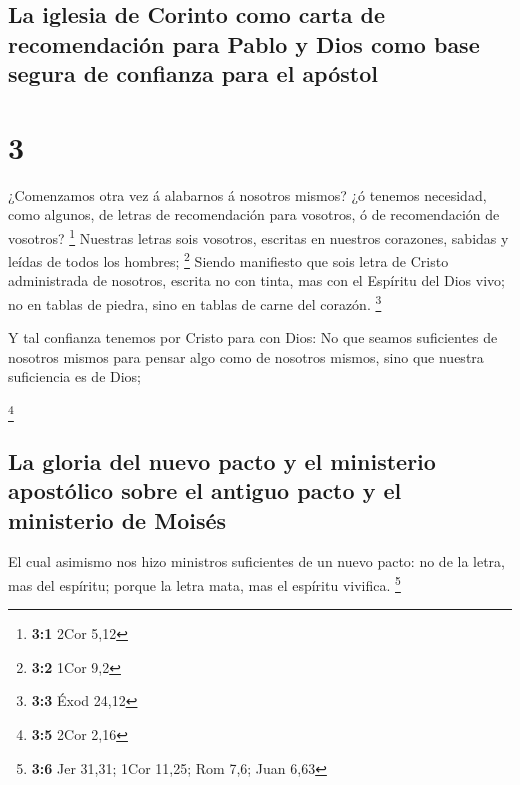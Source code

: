 \hypertarget{la-iglesia-de-corinto-como-carta-de-recomendaciuxf3n-para-pablo-y-dios-como-base-segura-de-confianza-para-el-apuxf3stol}{%
\subsection{La iglesia de Corinto como carta de recomendación para Pablo
y Dios como base segura de confianza para el
apóstol}\label{la-iglesia-de-corinto-como-carta-de-recomendaciuxf3n-para-pablo-y-dios-como-base-segura-de-confianza-para-el-apuxf3stol}}

\hypertarget{section-2}{%
\section{3}\label{section-2}}

 ¿Comenzamos otra vez á alabarnos á nosotros mismos? ¿ó
tenemos necesidad, como algunos, de letras de recomendación para
vosotros, ó de recomendación de vosotros? \footnote{\textbf{3:1} 2Cor
  5,12}  Nuestras letras sois vosotros, escritas en
nuestros corazones, sabidas y leídas de todos los hombres; \footnote{\textbf{3:2}
  1Cor 9,2}  Siendo manifiesto que sois letra de Cristo
administrada de nosotros, escrita no con tinta, mas con el Espíritu del
Dios vivo; no en tablas de piedra, sino en tablas de carne del corazón.
\footnote{\textbf{3:3} Éxod 24,12}

 Y tal confianza tenemos por Cristo para con Dios:
 No que seamos suficientes de nosotros mismos para pensar
algo como de nosotros mismos, sino que nuestra suficiencia es de Dios;

\footnote{\textbf{3:5} 2Cor 2,16}

\hypertarget{la-gloria-del-nuevo-pacto-y-el-ministerio-apostuxf3lico-sobre-el-antiguo-pacto-y-el-ministerio-de-moisuxe9s}{%
\subsection{La gloria del nuevo pacto y el ministerio apostólico sobre
el antiguo pacto y el ministerio de
Moisés}\label{la-gloria-del-nuevo-pacto-y-el-ministerio-apostuxf3lico-sobre-el-antiguo-pacto-y-el-ministerio-de-moisuxe9s}}

 El cual asimismo nos hizo ministros suficientes de un
nuevo pacto: no de la letra, mas del espíritu; porque la letra mata, mas
el espíritu vivifica. \footnote{\textbf{3:6} Jer 31,31; 1Cor 11,25; Rom
  7,6; Juan 6,63}


